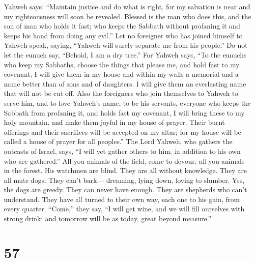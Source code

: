  Yahweh says: ``Maintain justice and do what is right, for
my salvation is near and my righteousness will soon be revealed.
 Blessed is the man who does this, and the son of man who
holds it fast; who keeps the Sabbath without profaning it and keeps his
hand from doing any evil.''  Let no foreigner who has
joined himself to Yahweh speak, saying, ``Yahweh will surely separate me
from his people.'' Do not let the eunuch say, ``Behold, I am a dry
tree.''  For Yahweh says, ``To the eunuchs who keep my
Sabbaths, choose the things that please me, and hold fast to my
covenant,  I will give them in my house and within my
walls a memorial and a name better than of sons and of daughters. I will
give them an everlasting name that will not be cut off. 
Also the foreigners who join themselves to Yahweh to serve him, and to
love Yahweh's name, to be his servants, everyone who keeps the Sabbath
from profaning it, and holds fast my covenant,  I will
bring these to my holy mountain, and make them joyful in my house of
prayer. Their burnt offerings and their sacrifices will be accepted on
my altar; for my house will be called a house of prayer for all
peoples.''  The Lord Yahweh, who gathers the outcasts of
Israel, says, ``I will yet gather others to him, in addition to his own
who are gathered.''  All you animals of the field, come to
devour, all you animals in the forest.  His watchmen are
blind. They are all without knowledge. They are all mute dogs. They
can't bark--- dreaming, lying down, loving to slumber. 
Yes, the dogs are greedy. They can never have enough. They are shepherds
who can't understand. They have all turned to their own way, each one to
his gain, from every quarter.  ``Come,'' they say, ``I
will get wine, and we will fill ourselves with strong drink; and
tomorrow will be as today, great beyond measure.''

\hypertarget{section-54}{%
\section{57}\label{section-54}}

